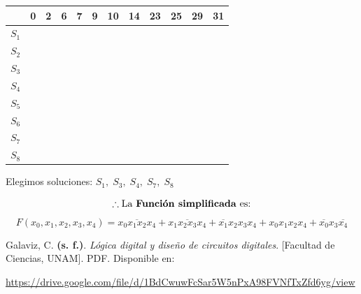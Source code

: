 \documentclass[12pt,letterpaper]{article}
\newcommand{\ekis}{\textcolor{dblue}{\ding{55}}}
\begin{document}
\begin{enumerate}[label=\arabic*.]
\begin{enumerate}[label=\arabic*)]
\begin{table}[H]
\begin{center}
\begin{tabular}{| c | c | c | c | c | c | c | c | c | c | c | c |}
          \hline 
          & 0 & 2 & 6 & 7 & 9 & 10 & 14 & 23 & 25 & 29 & 31   \\ \hline
          $S_1$ & \cellcolor{mostaza}\ekis & \cellcolor{mostaza}\ekis & & & & & & & & & \\ \hline
          $S_2$ & & & \ekis & \ekis & & & & & & & \\ \hline
          $S_3$ & & & & & \cellcolor{mostaza}\ekis & & & & \cellcolor{mostaza}\ekis & & \\ \hline
          $S_4$ & & & & \cellcolor{mostaza}\ekis & & & & \cellcolor{mostaza}\ekis & & & \\ \hline
          $S_5$ & & & & & & & & & \ekis & \ekis & \\ \hline
          $S_6$ & & & & & & & & \ekis & & & \ekis \\ \hline
          $S_7$ & & & & & & & & & & \cellcolor{mostaza}\ekis & \cellcolor{mostaza}\ekis \\ \hline
          $S_8$ & & \cellcolor{mostaza}\ekis & \cellcolor{mostaza}\ekis & & & \cellcolor{mostaza}\ekis & \cellcolor{mostaza}\ekis & & & & \\ \hline
        \end{tabular}
      \end{center}
    \end{table}
  \end{enumerate}
  
  Elegimos soluciones: $S_1,\; S_3,\; S_4,\; S_7,\; S_8$

  \[
  \therefore \text{La \textbf{Funci\'{o}n simplificada} es:}
  \]
  \[
  F(x_0, x_1, x_2, x_3, x_4) = \overline{x_0x_1x_2x_4} + x_1\overline{x_2x_3}x_4 + \overline{x_1}x_2x_3x_4 + x_0x_1x_2x_4 + \overline{x_0}x_3\overline{x_4}
  \]
\end{enumerate}

\begin{thebibliography}{1}

  Galaviz, C. \textbf{(s. f.)}. \textit{Lógica digital y diseño de circuitos digitales}. [Facultad de Ciencias, UNAM]. PDF. Disponible en:

  \url{https://drive.google.com/file/d/1BdCwuwFcSar5W5nPxA98FVNfTxZfd6yg/view}
\end{thebibliography}
\end{document}
